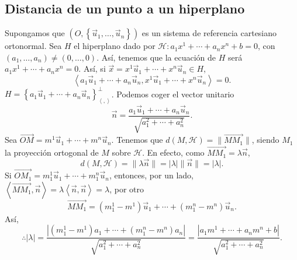 \subsection*{Distancia de un punto a un hiperplano}
Supongamos que $\displaystyle \left(O, \left\{ \vec{u}_{1}, \ldots, \vec{u}_{n}\right\} \right) $ es un sistema de referencia cartesiano ortonormal. Sea $\displaystyle H$ el hiperplano dado por $\displaystyle \mathcal{H} : a_{1}x^{1} + \cdots + a_{n}x^{n} + b = 0 $, con $\displaystyle \left(a_{1}, \ldots, a_{n}\right) \neq \left(0, \ldots, 0\right) $. Así, tenemos que la ecuación de $\displaystyle H $ será $\displaystyle a_{1}x^{1} + \cdots + a_{n}x^{n} = 0 $. Así, si $\displaystyle \vec{x} = x^{1}\vec{u}_{1} + \cdots + x^{n}\vec{u}_{n} \in H $,
	\[ \left\langle a_{1}\vec{u}_{1} + \cdots + a_{n}\vec{u}_{n}, x^{1}\vec{u}_{1} + \cdots + x^{n}\vec{u}_{n} \right\rangle = 0 .\]
	$\displaystyle H = \left\{ a_{1}\vec{u}_{1} + \cdots + a_{n}\vec{u}_{n}\right\} ^{\perp }_{\left\langle ,  \right\rangle } $. Podemos coger el vector unitario
	\[\vec{n} = \frac{a_{1}\vec{u}_{1} + \cdots + a_{n}\vec{u}_{n}}{\sqrt{a^{2}_{1} + \cdots + a^{2}_{n}}} .\]
Sea $\displaystyle \overrightarrow{OM} = m^{1}\vec{u}_{1} + \cdots + m^{n}\vec{u}_{n} $. Tenemos que $\displaystyle d\left(M, \mathcal{H}\right) = \|\overrightarrow{MM_{1}}\| $, siendo $\displaystyle M_{1} $ la proyección ortogonal de $\displaystyle M $ sobre $\displaystyle \mathcal{H} $. En efecto, como $\displaystyle \overrightarrow{MM_{1}} = \lambda \vec{n} $, 
\[d\left(M, \mathcal{H}\right) = \|\lambda \vec{n}\| = \left|\lambda \right|\|\vec{n}\| = \left|\lambda \right|.\]
Si $\displaystyle \overrightarrow{OM_{1}} = m_{1}^{1}\vec{u}_{1} + \cdots + m_{1}^{n}\vec{u}_{n} $, entonces, por un lado, $\displaystyle \left\langle \overrightarrow{MM_{1}}, \vec{n} \right\rangle  = \lambda \left\langle \vec{n}, \vec{n} \right\rangle = \lambda $, por otro
\[ \overrightarrow{MM_{1}} = \left(m^{1}_{1}-m^{1}\right)\vec{u}_{1} + \cdots + \left(m^{n}_{1}-m^{n}\right)\vec{u}_{n} .\]
Así, 
\[\therefore \left|\lambda \right| = \frac{ \left|\left(m^{1}_{1}-m^{1}\right)a_{1} + \cdots + \left(m^{n}_{1}-m^{n}\right)a_{n}\right|}{\sqrt{a^{2}_{1} + \cdots + a^{2}_{n}}} = \frac{ \left| a_{1}m^{1}+\cdots + a_{n}m^{n}+b\right|}{\sqrt{a^{2}_{1}+\cdots + a^{2}_{n}}}.\]
